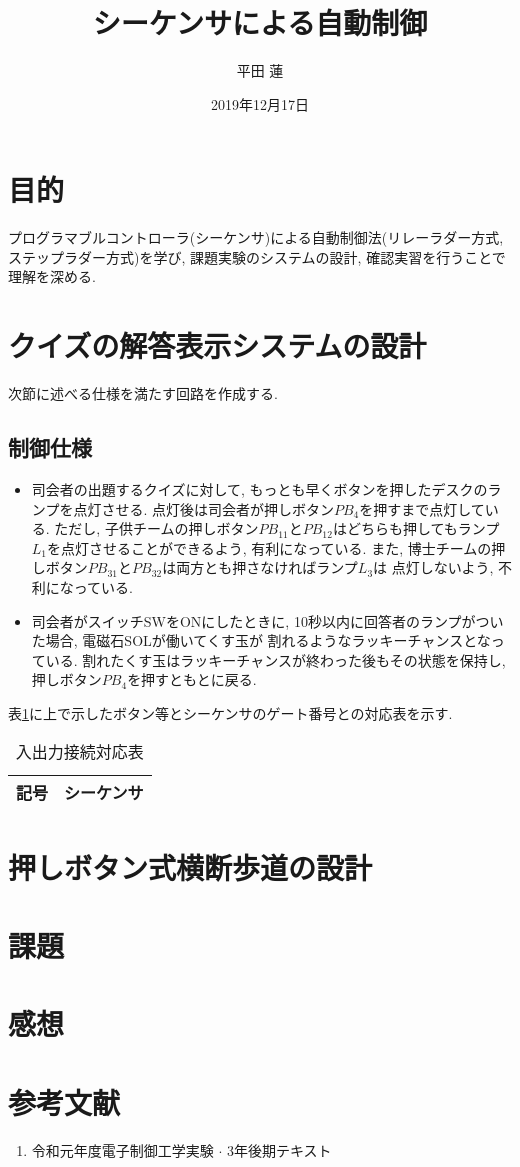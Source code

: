 \documentclass[titlepage]{jsarticle}
\title{シーケンサによる自動制御}
\author{平田 蓮}
\date{2019年12月17日}
\begin{document}
\maketitle
\section{目的}
  プログラマブルコントローラ(シーケンサ)による自動制御法(リレーラダー方式, ステップラダー方式)を学び, 課題実験のシステムの設計, 確認実習を行うことで理解を深める.
\section{クイズの解答表示システムの設計}
  次節に述べる仕様を満たす回路を作成する.
  \subsection{制御仕様}
    \begin{itemize}
      \item 司会者の出題するクイズに対して, もっとも早くボタンを押したデスクのランプを点灯させる.
        点灯後は司会者が押しボタン$PB_4$を押すまで点灯している.
        ただし, 子供チームの押しボタン$PB_{11}$と$PB_{12}$はどちらも押してもランプ$L_1$を点灯させることができるよう,
        有利になっている. また, 博士チームの押しボタン$PB_{31}$と$PB_{32}$は両方とも押さなければランプ$L_3$は
        点灯しないよう, 不利になっている.
      \item 司会者がスイッチSWをONにしたときに, 10秒以内に回答者のランプがついた場合, 電磁石SOLが働いてくす玉が
        割れるようなラッキーチャンスとなっている.
        割れたくす玉はラッキーチャンスが終わった後もその状態を保持し, 押しボタン$PB_4$を押すともとに戻る.
    \end{itemize}
  表\ref{tab:taiou}に上で示したボタン等とシーケンサのゲート番号との対応表を示す.
  \begin{table}[h]
    \caption{入出力接続対応表}
    \label{tab:taiou}
    \centering
    \begin{tabular}{c|c}
      記号 & シーケンサ \\ \hline \hline
    \end{tabular}
  \end{table}
\section{押しボタン式横断歩道の設計}
\section{課題}
\section{感想}
\section*{参考文献}
  \begin{enumerate}
    \item 令和元年度電子制御工学実験 $\cdot$ 3年後期テキスト
  \end{enumerate}
\end{document}
